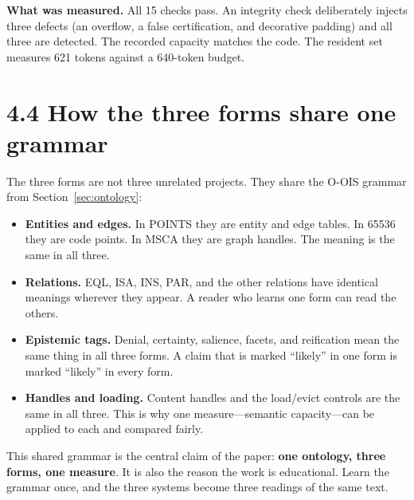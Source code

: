 \textbf{What was measured.} All 15 checks pass. An integrity check deliberately injects three defects (an overflow, a false certification, and decorative padding) and all three are detected. The recorded capacity matches the code. The resident set measures 621 tokens against a 640-token budget.

\section*{4.4 How the three forms share one grammar}

The three forms are not three unrelated projects. They share the O-OIS grammar from Section~\ref{sec:ontology}:

\begin{itemize}
\item \textbf{Entities and edges.} In POINTS they are entity and edge tables. In 65536 they are code points. In MSCA they are graph handles. The meaning is the same in all three.
\item \textbf{Relations.} EQL, ISA, INS, PAR, and the other relations have identical meanings wherever they appear. A reader who learns one form can read the others.
\item \textbf{Epistemic tags.} Denial, certainty, salience, facets, and reification mean the same thing in all three forms. A claim that is marked ``likely'' in one form is marked ``likely'' in every form.
\item \textbf{Handles and loading.} Content handles and the load/evict controls are the same in all three. This is why one measure---semantic capacity---can be applied to each and compared fairly.
\end{itemize}

This shared grammar is the central claim of the paper: \textbf{one ontology, three forms, one measure}. It is also the reason the work is educational. Learn the grammar once, and the three systems become three readings of the same text.
